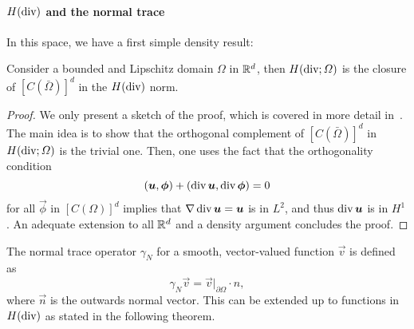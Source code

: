 \paragraph{$H(\operatorname{\text{div}})$ and the normal trace} In this space, we have a first simple density result: 
\begin{theorem}\label{thm:def-Hdiv-closure}
Consider a bounded and Lipschitz domain $\Omega$ in $\mathbb{R}^d$, then $H(\operatorname{\text{div}};\Omega)$ is the closure of $[C(\bar\Omega)]^d$ in the $H(\operatorname{\text{div}})$ norm.
\begin{proof}
We only present a sketch of the proof, which is covered in more detail in~\cite[Thm 3.22]{monk2003finite}. The main idea is to show that the orthogonal complement of $[C(\bar\Omega)]^d$ in $H(\operatorname{\text{div}};\Omega)$ is the trivial one. Then, one uses the fact that the orthogonality condition 
\begin{equation*}
    (\vec u, \vec \phi) + (\dive \vec u, \dive \vec \phi) = 0
\end{equation*}
for all $\vec\phi$ in $[C(\Omega)]^d$ implies that $\grad \dive\vec u = \vec u$ is in $L^2$, and thus $\dive \vec u$ is in $H^1$. An adequate extension to all $\mathbb{R}^d$ and a density argument concludes the proof.
\end{proof}
\end{theorem}
\begin{definition}\label{def:normal-trace}
    The normal trace operator $\gamma_N$ for a smooth, vector-valued function $\vec v$ is defined as 
    \begin{equation}\label{eq:def-normal-trace}
        \gamma_N \vec v = \vec v|_{\partial\Omega} \cdot n,
    \end{equation}
    where $\vec n $ is the outwards normal vector. This can be extended up to functions in $H(\operatorname{\text{div}})$ as stated in the following theorem.
\end{definition}

